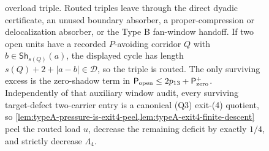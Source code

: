 \documentclass[11pt]{article}
\newcommand{\Pow}{\mathcal D}
\newcommand{\Sh}{\mathsf{Sh}}
\begin{document}
\begin{figure}[t]
{overload triple.  Routed triples leave through the direct dyadic certificate,
an unused boundary absorber, a proper-compression or delocalization absorber,
or the Type B fan-window handoff.  If two open units have a recorded
\(P\)-avoiding corridor \(Q\) with \(b\in\Sh_{s(Q)}(a)\), the displayed cycle
has length \(s(Q)+2+|a-b|\in\Pow\), so the triple is routed.  The only
surviving excess is the zero-shadow term in
\(\mathsf P_{\rm open}\le2p_{13}+\mathsf P_{\rm zero}^{+}\).  Independently of
that auxiliary window audit, every surviving target-defect two-carrier entry is
a canonical \textup{(Q3)} exit-\textup{(4)} quotient, so
\cref{lem:typeA-pressure-is-exit4-peel,lem:typeA-exit4-finite-descent} peel
the routed load \(u\), decrease the remaining deficit by exactly \(1/4\), and
strictly decrease \(\Lambda_4\).}
\label{fig:exit4-p13-attachment-accounting}
\end{figure}
\end{document}
